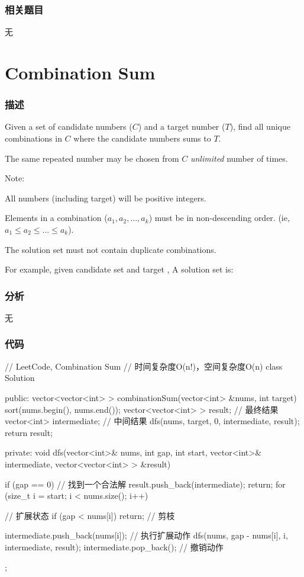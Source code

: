\subsubsection{相关题目}
\begindot
\item 无
\myenddot


\section{Combination Sum} %
\label{sec:combination-sum}


\subsubsection{描述}
Given a set of candidate numbers ($C$) and a target number ($T$), find all unique combinations in $C$ where the candidate numbers sums to $T$.

The same repeated number may be chosen from $C$ \emph{unlimited} number of times.

Note:
\begindot
\item All numbers (including target) will be positive integers.
\item Elements in a combination ($a_1, a_2, ..., a_k$) must be in non-descending order. (ie, $a_1 \leq a_2 \leq ... \leq a_k$).
\item The solution set must not contain duplicate combinations.
\myenddot

For example, given candidate set  and target , 
A solution set is: 
\begin{Code}
[7] 
[2, 2, 3] 
\end{Code}


\subsubsection{分析}
无


\subsubsection{代码}
\begin{Code}
// LeetCode, Combination Sum
// 时间复杂度O(n!)，空间复杂度O(n)
class Solution {
public:
    vector<vector<int> > combinationSum(vector<int> &nums, int target) {
        sort(nums.begin(), nums.end());
        vector<vector<int> > result; // 最终结果
        vector<int> intermediate; // 中间结果
        dfs(nums, target, 0, intermediate, result);
        return result;
    }

private:
    void dfs(vector<int>& nums, int gap, int start, vector<int>& intermediate,
            vector<vector<int> > &result) {
        if (gap == 0) {  // 找到一个合法解
            result.push_back(intermediate);
            return;
        }
        for (size_t i = start; i < nums.size(); i++) { // 扩展状态
            if (gap < nums[i]) return; // 剪枝

            intermediate.push_back(nums[i]); // 执行扩展动作
            dfs(nums, gap - nums[i], i, intermediate, result);
            intermediate.pop_back();  // 撤销动作
        }
    }
};
\end{Code}


